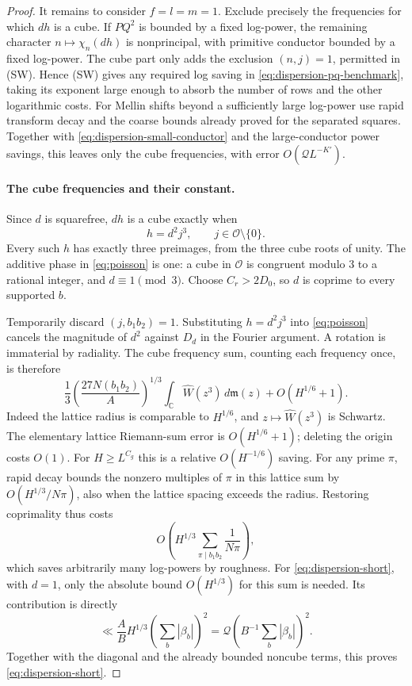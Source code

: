 \begin{proof}
It remains to consider $f=l=m=1$. Exclude precisely the frequencies
for which $dh$ is a cube. If $PQ^2$ is bounded by a fixed log-power,
the remaining character $n\mapsto\chi_n(dh)$ is nonprincipal, with
primitive conductor bounded by a fixed log-power. The cube part only
adds the exclusion $(n,j)=1$, permitted in (SW). Hence (SW) gives any
required log saving in \eqref{eq:dispersion-pq-benchmark}, taking its
exponent large enough to absorb the number of rows and the other
logarithmic costs. For Mellin shifts beyond a sufficiently large
log-power use rapid transform decay and the coarse bounds already
proved for the separated squares. Together with
\eqref{eq:dispersion-small-conductor} and the large-conductor power
savings, this leaves only the cube frequencies, with error
$O(\mathcal Q L^{-K'})$.

\paragraph{The cube frequencies and their constant.}
Since $d$ is squarefree, $dh$ is a cube exactly when
\[
 h=d^2j^3,\qquad j\in\mathcal O\setminus\{0\}.
\]
Every such $h$ has exactly three preimages, from the three cube roots
of unity. The additive phase in \eqref{eq:poisson} is one: a cube in
$\mathcal O$ is congruent modulo $3$ to a rational integer, and
$d\equiv1\pmod3$. Choose $C_r>2D_0$, so $d$ is coprime to every
supported $b$.

Temporarily discard $(j,b_1b_2)=1$. Substituting $h=d^2j^3$ into
\eqref{eq:poisson} cancels the magnitude of $d^2$ against $D_d$ in
the Fourier argument. A rotation is immaterial by radiality. The cube
frequency sum, counting each frequency once, is therefore
\begin{equation}
 \frac13\left(\frac{27N(b_1b_2)}A\right)^{1/3}
       \int_{\mathbb C}\widehat W(z^3)\,d\mathfrak m(z)
       +O(H^{1/6}+1).
 \label{eq:dispersion-cube-lattice}
\end{equation}
Indeed the lattice radius is comparable to $H^{1/6}$, and
$z\mapsto\widehat W(z^3)$ is Schwartz. The elementary lattice
Riemann-sum error is $O(H^{1/6}+1)$; deleting the origin costs $O(1)$.
For $H\ge L^{C_g}$ this is a relative $O(H^{-1/6})$ saving.
For any prime $\pi$, rapid decay bounds the nonzero multiples of $\pi$
in this lattice sum by $O(H^{1/3}/N\pi)$, also when the lattice
spacing exceeds the radius. Restoring coprimality thus costs
\[
 O\left(H^{1/3}\sum_{\pi\mid b_1b_2}\frac1{N\pi}\right),
\]
which saves arbitrarily many log-powers by roughness. For
\eqref{eq:dispersion-short}, with $d=1$, only the absolute bound
$O(H^{1/3})$ for this sum is needed. Its contribution is directly
\[
 \ll \frac AB H^{1/3}\left(\sum_b|\beta_b|\right)^2
 =\mathcal Q\left(B^{-1}\sum_b|\beta_b|\right)^2.
\]
Together with the diagonal and the already bounded noncube terms, this
proves \eqref{eq:dispersion-short}.


\end{proof}
